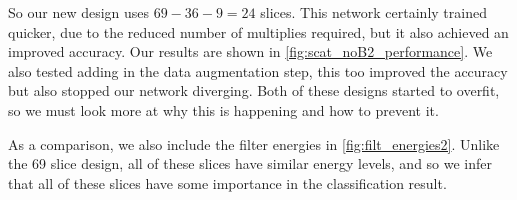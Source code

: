   So our new design uses $69-36-9=24$ slices. 
  This network certainly trained quicker,
  due to the reduced number of multiplies required, but it also achieved an
  improved accuracy. Our results are shown in
  \autoref{fig:scat_noB2_performance}. We also tested adding in the data
  augmentation step, this too improved the accuracy but also stopped our network
  diverging. Both of these designs started to overfit, so we must look more at
  why this is happening and how to prevent it.

  As a comparison, we also include the filter energies in
  \autoref{fig:filt_energies2}. Unlike the 69 slice design, all of these slices
  have similar energy levels, and so we infer that all of these slices have
  some importance in the classification result.


